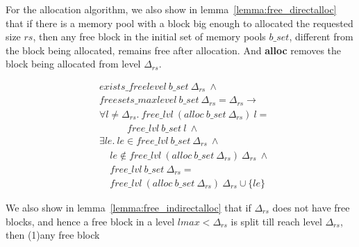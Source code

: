For the allocation algorithm, we also show in lemma~\ref{lemma:free_directalloc} that if there is a memory pool with a block big enough to allocated the requested size $rs$, then any free block in the initial set of memory pools $b\_set$, different from the block being allocated, remains free after allocation. And \textbf{alloc} removes the block being allocated from level $\Delta_{rs}$.

\begin{lemma} 
\label{lemma:free_directalloc}
\end{lemma}
\vspace{-7pt}
\begin{align*}
&exists\_freelevel\ b\_set\ \Delta_{rs}\ \wedge\\
&freesets\_maxlevel\ b\_set\ \Delta_{rs} = \Delta_{rs} \longrightarrow\\
&\forall l \ne \Delta_{rs}.\ free\_lvl\ (alloc\ b\_set\ \Delta_{rs})\ l =\\
&\ \ \ \ \ \ \ \ \ \ \ \ \ free\_lvl\ b\_set\ l\ \wedge\\
&\exists le.\ le \in free\_lvl\ b\_set\ \Delta_{rs}\ \wedge\\
&\ \ \ \ \ le \notin free\_lvl\ (alloc\ b\_set\ \Delta_{rs})\ \Delta_{rs}\ \wedge\\
&\ \ \ \ \ free\_lvl\ b\_set\ \Delta_{rs} =\\
&\ \ \ \ \ free\_lvl\ (alloc\ b\_set\ \Delta_{rs})\ \Delta_{rs} \cup \lbrace le \rbrace
\end{align*}
\vspace{-12pt}

We also show in lemma~\ref{lemma:free_indirectalloc} that if $\Delta_{rs}$ does not have free blocks, and hence a free block in a level $lmax < \Delta_{rs}$ is split till reach level $\Delta_{rs}$, then (1)any free block 

